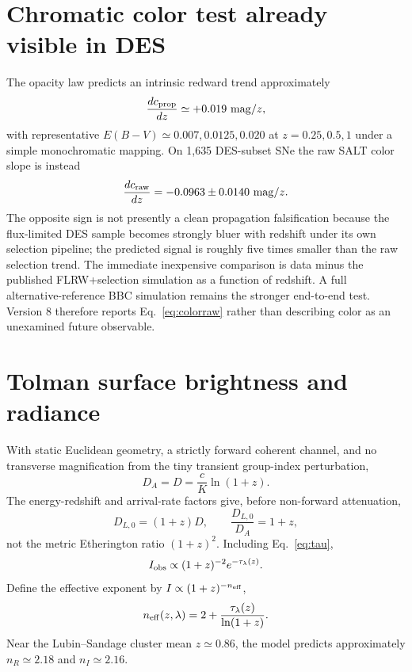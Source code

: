 \documentclass[11pt]{article}
\begin{document}
\section{Chromatic color test already visible in DES}
The opacity law predicts an intrinsic redward trend approximately
\begin{equation}
 \frac{dc_{\rm prop}}{dz}\simeq+0.019\ {\rm mag}/z,
 \label{eq:colorpred}
\end{equation}
with representative $E(B-V)\simeq0.007,0.0125,0.020$ at $z=0.25,0.5,1$ under a simple monochromatic mapping. On 1,635 DES-subset SNe the raw SALT color slope is instead
\begin{equation}
 \frac{dc_{\rm raw}}{dz}=-0.0963\pm0.0140\ {\rm mag}/z.
 \label{eq:colorraw}
\end{equation}
The opposite sign is not presently a clean propagation falsification because the flux-limited DES sample becomes strongly bluer with redshift under its own selection pipeline; the predicted signal is roughly five times smaller than the raw selection trend. The immediate inexpensive comparison is data minus the published FLRW+selection simulation as a function of redshift. A full alternative-reference BBC simulation remains the stronger end-to-end test. Version 8 therefore reports Eq.~\eqref{eq:colorraw} rather than describing color as an unexamined future observable.

\section{Tolman surface brightness and radiance}
\label{sec:tolman}
With static Euclidean geometry, a strictly forward coherent channel, and no transverse magnification from the tiny transient group-index perturbation,
\begin{equation}
 D_A=D=\frac{c}{K}\ln(1+z).
 \label{eq:DA}
\end{equation}
The energy-redshift and arrival-rate factors give, before non-forward attenuation,
\begin{equation}
 D_{L,0}=(1+z)D,
 \qquad
 \frac{D_{L,0}}{D_A}=1+z,
 \label{eq:duality}
\end{equation}
not the metric Etherington ratio $(1+z)^2$. Including Eq.~\eqref{eq:tau},
\begin{equation}
 I_{\rm obs}\propto(1+z)^{-2}e^{-\tau_\lambda(z)}.
 \label{eq:tolman}
\end{equation}
Define the effective exponent by $I\propto(1+z)^{-n_{\rm eff}}$,
\begin{equation}
 n_{\rm eff}(z,\lambda)=2+\frac{\tau_\lambda(z)}{\ln(1+z)}.
 \label{eq:neff}
\end{equation}
Near the Lubin--Sandage cluster mean $z\simeq0.86$, the model predicts approximately $n_R\simeq2.18$ and $n_I\simeq2.16$.
\end{document}
